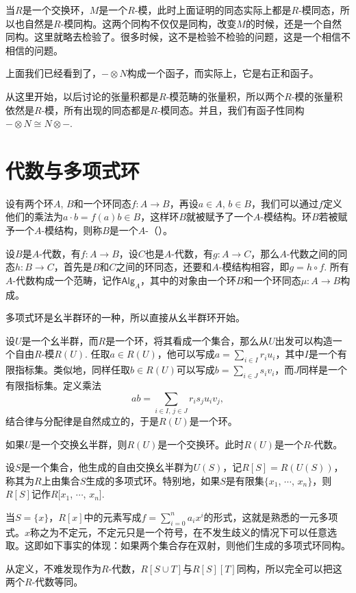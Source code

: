 当$R$是一个交换环，$M$是一个$R$-模，此时上面证明的同态实际上都是$R$-模同态，所以也自然是$R$-模同构。这两个同构不仅仅是同构，改变$M$的时候，还是一个自然同构。这里就略去检验了。很多时候，这不是检验不检验的问题，这是一个相信不相信的问题。

\para 上面我们已经看到了，$-\otimes N$构成一个函子，而实际上，它是右正和函子。

\para 从这里开始，以后讨论的张量积都是$R$-模范畴的张量积，所以两个$R$-模的张量积依然是$R$-模，所有出现的同态都是$R$-模同态。并且，我们有函子性同构$-\otimes N\cong N\otimes -$.


\section{代数与多项式环}

设有两个环$A$, $B$和一个环同态$f:A\to B$，再设$a\in A$, $b\in B$，我们可以通过$f$定义他们的乘法为$a\cdot b=f(a)b\in B$，这样环$B$就被赋予了一个$A$-模结构。环$B$若被赋予一个$A$-模结构，则称$B$是一个$A$-（）。

设$B$是$A$-代数，有$f:A\to B$，设$C$也是$A$-代数，有$g:A\to C$，那么$A$-代数之间的同态$h:B\to C$，首先是$B$和$C$之间的环同态，还要和$A$-模结构相容，即$g=h\circ f$. 所有$A$-代数构成一个范畴，记作$\mathsf{Alg}_A$，其中的对象由一个环$B$和一个环同态$\mu:A\to B$构成。

多项式环是幺半群环的一种，所以直接从幺半群环开始。

\para 设$U$是一个幺半群，而$R$是一个环，将其看成一个集合，那么从$U$出发可以构造一个自由$R$-模$R(U)$. 任取$a\in R(U)$，他可以写成$a=\sum_{i\in I} r_i u_i$，其中$I$是一个有限指标集。类似地，同样任取$b\in R(U)$可以写成$b=\sum_{i\in J} s_i v_i$，而$J$同样是一个有限指标集。定义乘法
\[
	ab=\sum_{i\in I,\, j\in J}r_is_j u_i v_j,
\]
结合律与分配律是自然成立的，于是$R(U)$是一个环。

如果$U$是一个交换幺半群，则$R(U)$是一个交换环。此时$R(U)$是一个$R$-代数。

\para 设$S$是一个集合，他生成的自由交换幺半群为$U(S)$，记$R[S]=R(U(S))$，称其为$R$上由集合$S$生成的多项式环。特别地，如果$S$是有限集$\{x_1$, $\cdots$, $x_n\}$，则$R[S]$记作$R[x_1$, $\cdots$, $x_n]$. 

当$S=\{x\}$，$R[x]$中的元素写成$f=\sum_{i=0}^na_ix^i$的形式，这就是熟悉的一元多项式。$x$称之为不定元，不定元只是一个符号，在不发生歧义的情况下可以任意选取。这即如下事实的体现：如果两个集合存在双射，则他们生成的多项式环同构。

从定义，不难发现作为$R$-代数，$R[S\cup T]$与$R[S][T]$同构，所以完全可以把这两个$R$-代数等同。

